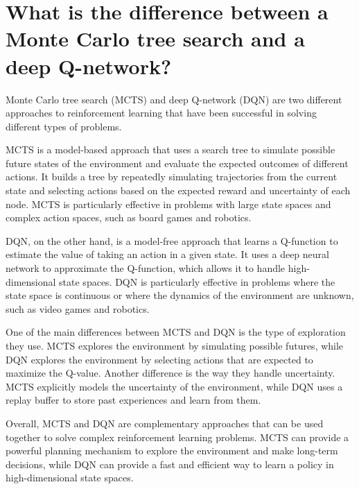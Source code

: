 \section{What is the difference between a Monte Carlo tree search and a deep Q-network?}
Monte Carlo tree search (MCTS) and deep Q-network (DQN) are two different approaches to reinforcement learning that have been successful in solving different types of problems.

MCTS is a model-based approach that uses a search tree to simulate possible future states of the environment and evaluate the expected outcomes of different actions. It builds a tree by repeatedly simulating trajectories from the current state and selecting actions based on the expected reward and uncertainty of each node. MCTS is particularly effective in problems with large state spaces and complex action spaces, such as board games and robotics.

DQN, on the other hand, is a model-free approach that learns a Q-function to estimate the value of taking an action in a given state. It uses a deep neural network to approximate the Q-function, which allows it to handle high-dimensional state spaces. DQN is particularly effective in problems where the state space is continuous or where the dynamics of the environment are unknown, such as video games and robotics.

One of the main differences between MCTS and DQN is the type of exploration they use. MCTS explores the environment by simulating possible futures, while DQN explores the environment by selecting actions that are expected to maximize the Q-value. Another difference is the way they handle uncertainty. MCTS explicitly models the uncertainty of the environment, while DQN uses a replay buffer to store past experiences and learn from them.

Overall, MCTS and DQN are complementary approaches that can be used together to solve complex reinforcement learning problems. MCTS can provide a powerful planning mechanism to explore the environment and make long-term decisions, while DQN can provide a fast and efficient way to learn a policy in high-dimensional state spaces.

